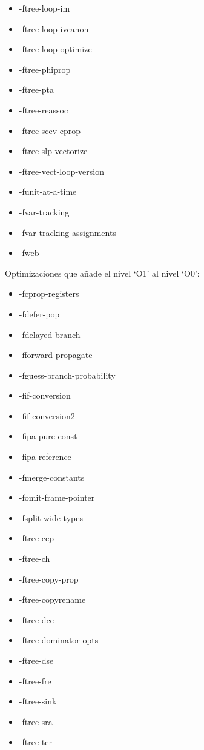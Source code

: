 \begin{multicols}{2}
\begin{itemize}[noitemsep, topsep=0pt, parsep=0pt, partopsep=0pt]
	\item -ftree-loop-im
	\item -ftree-loop-ivcanon
	\item -ftree-loop-optimize
	\item -ftree-phiprop
	\item -ftree-pta
	\item -ftree-reassoc
	\item -ftree-scev-cprop
	\item -ftree-slp-vectorize
	\item -ftree-vect-loop-version
	\item -funit-at-a-time
	\item -fvar-tracking
	\item -fvar-tracking-assignments
	\item -fweb
\end{itemize}
\end{multicols}

Optimizaciones que añade el nivel `O1' al nivel `O0':

\begin{multicols}{2}
\begin{itemize}[noitemsep, topsep=0pt, parsep=0pt, partopsep=0pt]
	\item -fcprop-registers
	\item -fdefer-pop
	\item -fdelayed-branch
	\item -fforward-propagate
	\item -fguess-branch-probability
	\item -fif-conversion
	\item -fif-conversion2
	\item -fipa-pure-const
	\item -fipa-reference
	\item -fmerge-constants
	\item -fomit-frame-pointer
	\item -fsplit-wide-types
	\item -ftree-ccp
	\item -ftree-ch
	\item -ftree-copy-prop
	\item -ftree-copyrename
	\item -ftree-dce
	\item -ftree-dominator-opts
	\item -ftree-dse
	\item -ftree-fre
	\item -ftree-sink
	\item -ftree-sra
	\item -ftree-ter
\end{itemize}
\end{multicols}

